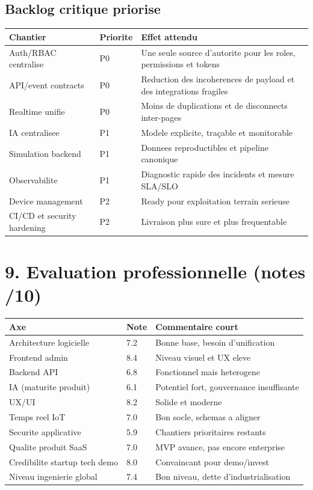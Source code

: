 \documentclass[12pt,a4paper]{article}
\begin{document}
\subsection{Backlog critique priorise}
\begin{longtable}{p{4.2cm}p{1.8cm}p{8.4cm}}
\toprule
\textbf{Chantier} & \textbf{Priorite} & \textbf{Effet attendu} \\
\midrule
Auth/RBAC centralise & P0 & Une seule source d'autorite pour les roles, permissions et tokens \\
API/event contracts & P0 & Reduction des incoherences de payload et des integrations fragiles \\
Realtime unifie & P0 & Moins de duplications et de disconnects inter-pages \\
IA centralisee & P1 & Modele explicite, traçable et monitorable \\
Simulation backend & P1 & Donnees reproductibles et pipeline canonique \\
Observabilite & P1 & Diagnostic rapide des incidents et mesure SLA/SLO \\
Device management & P2 & Ready pour exploitation terrain serieuse \\
CI/CD et security hardening & P2 & Livraison plus sure et plus frequentable \\
\bottomrule
\end{longtable}

\section{9. Evaluation professionnelle (notes /10)}
\begin{longtable}{p{8.5cm}p{2cm}p{4cm}}
\toprule
\textbf{Axe} & \textbf{Note} & \textbf{Commentaire court} \\
\midrule
Architecture logicielle & 7.2 & Bonne base, besoin d'unification \\
Frontend admin & 8.4 & Niveau visuel et UX eleve \\
Backend API & 6.8 & Fonctionnel mais heterogene \\
IA (maturite produit) & 6.1 & Potentiel fort, gouvernance insuffisante \\
UX/UI & 8.2 & Solide et moderne \\
Temps reel IoT & 7.0 & Bon socle, schemas a aligner \\
Securite applicative & 5.9 & Chantiers prioritaires restants \\
Qualite produit SaaS & 7.0 & MVP avance, pas encore enterprise \\
Credibilite startup tech demo & 8.0 & Convaincant pour demo/invest \\
Niveau ingenierie global & 7.4 & Bon niveau, dette d'industrialisation \\
\bottomrule
\end{longtable}
\end{document}

